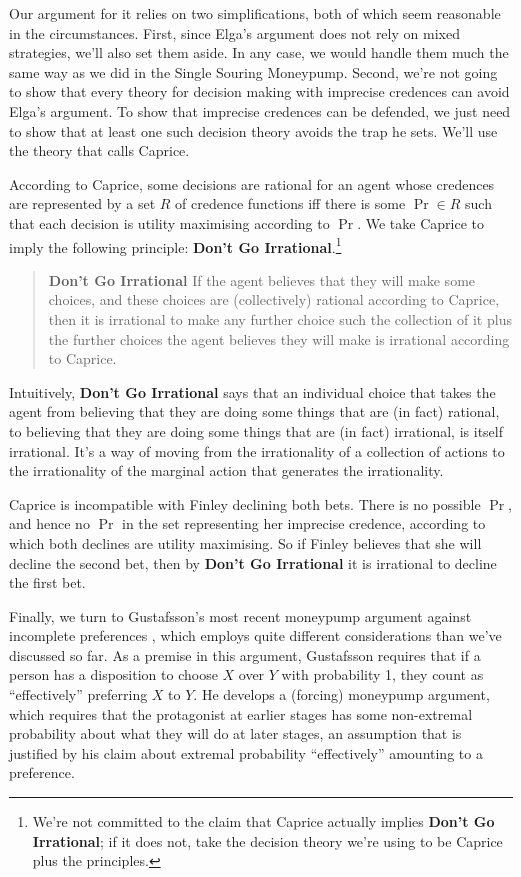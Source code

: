 \documentclass[
  11pt,
  letterpaper]{article}
\begin{document}
Our argument for it relies on two simplifications, both of which seem reasonable in the circumstances. First, since Elga's argument does not rely on mixed strategies, we'll also set them aside. In any case, we would handle them much the same way as we did in the Single Souring Moneypump. Second, we're not going to show that every theory for decision making with imprecise credences can avoid Elga's argument. To show that imprecise credences can be defended, we just need to show that at least one such decision theory avoids the trap he sets. We'll use the theory that \citet{weatherson2008decision} calls Caprice.

According to Caprice, some decisions are rational for an agent whose credences are represented by a set $R$ of credence functions iff there is some $\Pr \in R$ such that each decision is utility maximising according to $\Pr$. We take Caprice to imply the following principle: \textbf{Don't Go Irrational}.\footnote{We're not committed to the claim that Caprice actually implies \textbf{Don't Go Irrational}; if it does not, take the decision theory we're using to be Caprice plus the principles.}

\begin{quote}
    \textbf{Don't Go Irrational} If the agent believes that they will make some choices, and these choices are (collectively) rational according to Caprice, then it is irrational to make any further choice such the collection of it plus the further choices the agent believes they will make is irrational according to Caprice.

\end{quote}

Intuitively, \textbf{Don't Go Irrational} says that an individual choice that takes the agent from believing that they are doing some things that are (in fact) rational, to believing that they are doing some things that are (in fact) irrational, is itself irrational. It's a way of moving from the irrationality of a collection of actions to the irrationality of the marginal action that generates the irrationality.

Caprice is incompatible with Finley declining both bets. There is no possible $\Pr$, and hence no $\Pr$ in the set representing her imprecise credence, according to which both declines are utility maximising. So if Finley believes that she will decline the second bet, then by \textbf{Don't Go Irrational} it is irrational to decline the first bet.

Finally, we turn to Gustafsson's most recent moneypump argument against incomplete preferences \citep{Gustafsson2025}, which employs quite different considerations than we've discussed so far. As a premise in this argument, Gustafsson requires that if a person has a disposition to choose $X$ over $Y$ with probability 1, they count as ``effectively'' preferring $X$ to $Y$. He develops a (forcing) moneypump argument, which requires that the protagonist at earlier stages has some non-extremal probability about what they will do at later stages, an assumption that is justified by his claim about extremal probability ``effectively'' amounting to a preference.
\end{document}
